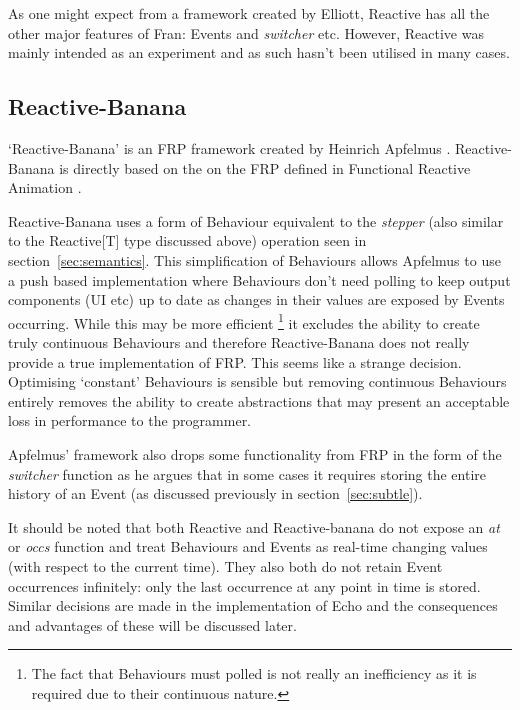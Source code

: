       As one might expect from a framework created by Elliott, Reactive has all the other major features
      of Fran: Events and \emph{switcher} etc. However, Reactive was mainly intended as an experiment
      and as such hasn't been utilised in many cases.
  
    \subsection{Reactive-Banana}
      `Reactive-Banana' is an FRP framework created by Heinrich Apfelmus \cite{Apfelmus}. Reactive-Banana
      is directly based on the on the FRP defined in Functional Reactive Animation \cite{Elliott1997}. 
      
      Reactive-Banana uses a form of Behaviour equivalent to the \emph{stepper}
      (also similar to the Reactive[T] type discussed above) operation seen in section~\ref{sec:semantics}. This simplification of Behaviours 
      allows 
      Apfelmus to use a push
      based implementation where Behaviours don't need polling to keep output components (UI etc) up to date as changes in 
      their values are exposed
      by Events occurring. While this may be more efficient \footnote{The fact that Behaviours must polled is not really an 
      inefficiency as it is required due to their continuous nature. } it excludes the ability to create truly 
      continuous Behaviours and therefore Reactive-Banana does not really provide a true implementation
      of FRP. This seems like a strange decision. Optimising `constant' Behaviours is sensible
      but removing continuous Behaviours entirely removes the ability to create abstractions that may present
      an acceptable loss in performance to the programmer.
      
      Apfelmus' framework also drops some functionality from FRP in the form of the \emph{switcher} function as
      he argues that in some cases it requires storing the entire history of an Event \cite{Apfelmus2011} (as discussed 
      previously
      in section~\ref{sec:subtle}).
      
    It should be noted that both Reactive and Reactive-banana do not expose an \emph{at} or \emph{occs} function
    and treat Behaviours and Events as real-time changing values (with respect to the current time). They also both do not 
    retain Event 
    occurrences infinitely: only the last occurrence at any point in time is stored. Similar decisions are made in the 
    implementation of Echo and the consequences and advantages of these will be discussed later.

